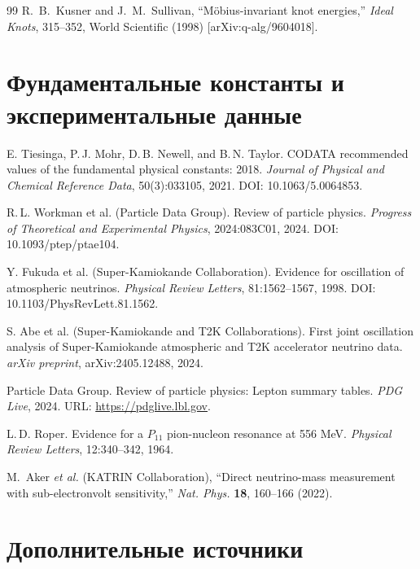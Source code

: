\documentclass[11pt,a4paper]{article}
\begin{document}
\begin{thebibliography}{99}
		 R.~B.~Kusner and J.~M.~Sullivan, ``Möbius-invariant knot energies,''
		\textit{Ideal Knots}, 315--352, World Scientific (1998) [arXiv:q-alg/9604018].
		
		\section*{Фундаментальные константы и экспериментальные данные}
		
		E. Tiesinga, P.\,J. Mohr, D.\,B. Newell, and B.\,N. Taylor.
		\newblock CODATA recommended values of the fundamental physical constants: 2018.
		\newblock \textit{Journal of Physical and Chemical Reference Data}, 50(3):033105, 2021.
		\newblock DOI: 10.1063/5.0064853.
		
		R.\,L. Workman et al. (Particle Data Group).
		\newblock Review of particle physics.
		\newblock \textit{Progress of Theoretical and Experimental Physics}, 2024:083C01, 2024.
		\newblock DOI: 10.1093/ptep/ptae104.
		
		Y. Fukuda et al. (Super-Kamiokande Collaboration).
		\newblock Evidence for oscillation of atmospheric neutrinos.
		\newblock \textit{Physical Review Letters}, 81:1562--1567, 1998.
		\newblock DOI: 10.1103/PhysRevLett.81.1562.
		
		S. Abe et al. (Super-Kamiokande and T2K Collaborations).
		\newblock First joint oscillation analysis of Super-Kamiokande atmospheric and T2K accelerator neutrino data.
		\newblock \textit{arXiv preprint}, arXiv:2405.12488, 2024.
		
		Particle Data Group.
		 Review of particle physics: Lepton summary tables.
		\newblock \textit{PDG Live}, 2024.
		\newblock URL: \url{https://pdglive.lbl.gov}.
		
		L.\,D. Roper.
		\newblock Evidence for a $P_{11}$ pion-nucleon resonance at 556 MeV.
		\newblock \textit{Physical Review Letters}, 12:340--342, 1964.
		
		M.~Aker \textit{et al.} (KATRIN Collaboration), ``Direct neutrino-mass measurement with sub-electronvolt sensitivity,'' \textit{Nat. Phys.} \textbf{18}, 160--166 (2022).
		
		\section*{Дополнительные источники}
		

\end{thebibliography}
\end{document}
